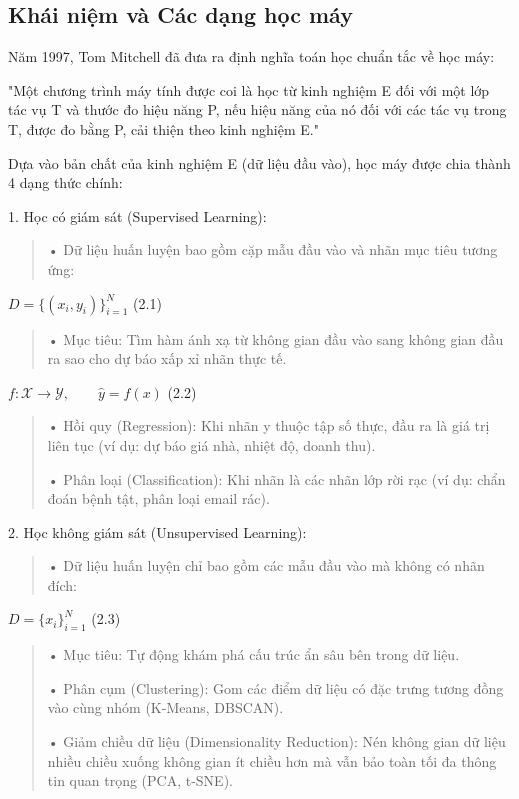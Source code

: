 \subsection{Khái niệm và Các dạng học máy}\label{khuxe1i-niux1ec7m-vuxe0-cuxe1c-dux1ea1ng-hux1ecdc-muxe1y}

Năm 1997, Tom Mitchell đã đưa ra định nghĩa toán học chuẩn tắc về học
máy:

"Một chương trình máy tính được coi là học từ kinh nghiệm E đối với một
lớp tác vụ T và thước đo hiệu năng P, nếu hiệu năng của nó đối với các
tác vụ trong T, được đo bằng P, cải thiện theo kinh nghiệm E."

Dựa vào bản chất của kinh nghiệm E (dữ liệu đầu vào), học máy được chia
thành 4 dạng thức chính:

1. Học có giám sát (Supervised Learning):

\begin{quote}
• Dữ liệu huấn luyện bao gồm cặp mẫu đầu vào và nhãn mục tiêu tương ứng:
\end{quote}

\(D = \{(x_{i},y_{i})\}_{i = 1}^{N}\) (2.1)

\begin{quote}
• Mục tiêu: Tìm hàm ánh xạ từ không gian đầu vào sang không gian đầu ra
sao cho dự báo xấp xỉ nhãn thực tế.
\end{quote}

\(f:\mathcal{X} \rightarrow \mathcal{Y},\quad\quad\hat{y} = f(x)\) (2.2)

\begin{quote}
• Hồi quy (Regression): Khi nhãn y thuộc tập số thực, đầu ra là giá trị
liên tục (ví dụ: dự báo giá nhà, nhiệt độ, doanh thu).

• Phân loại (Classification): Khi nhãn là các nhãn lớp rời rạc (ví dụ:
chẩn đoán bệnh tật, phân loại email rác).
\end{quote}

2. Học không giám sát (Unsupervised Learning):

\begin{quote}
• Dữ liệu huấn luyện chỉ bao gồm các mẫu đầu vào mà không có nhãn đích:
\end{quote}

\(D = \{ x_{i}\}_{i = 1}^{N}\) (2.3)

\begin{quote}
• Mục tiêu: Tự động khám phá cấu trúc ẩn sâu bên trong dữ liệu.

• Phân cụm (Clustering): Gom các điểm dữ liệu có đặc trưng tương đồng
vào cùng nhóm (K-Means, DBSCAN).

• Giảm chiều dữ liệu (Dimensionality Reduction): Nén không gian dữ liệu
nhiều chiều xuống không gian ít chiều hơn mà vẫn bảo toàn tối đa thông
tin quan trọng (PCA, t-SNE).
\end{quote}

